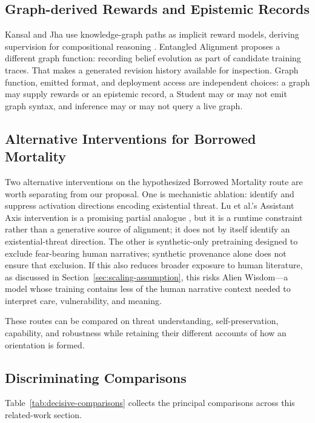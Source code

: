 \documentclass[11pt]{article}
\begin{document}
\subsection{Graph-derived Rewards and Epistemic Records}

Kansal and Jha use knowledge-graph paths as implicit reward models,
deriving supervision for compositional reasoning
\cite{kansal2026knowledgegraphsimplicitreward}. Entangled Alignment proposes a different graph
function: recording belief evolution as part of candidate training traces.
That makes a generated revision history available for inspection. Graph function, emitted format, and deployment access
are independent choices: a graph may supply rewards or an epistemic record,
a Student may or may not emit graph syntax, and inference may or may not
query a live graph.

\subsection{Alternative Interventions for Borrowed Mortality}

	Two alternative interventions on the hypothesized Borrowed Mortality route
are worth separating from our proposal.
	One is mechanistic ablation: identify and suppress activation directions
	encoding existential threat. Lu et al.'s Assistant Axis intervention is a
	promising partial analogue \cite{lu2026assistantaxissituatingstabilizing},
	but it is a runtime constraint rather than a generative source of alignment;
it does not by itself identify an existential-threat direction.
		The other is synthetic-only pretraining designed to exclude fear-bearing
		human narratives; synthetic provenance alone does not ensure that exclusion.
		If this also reduces broader exposure to human literature, as discussed in
		Section~\ref{sec:scaling-assumption}, this risks Alien Wisdom---a model whose
		training contains less of the human narrative context needed to interpret
		care, vulnerability, and meaning.

These routes can be compared on threat understanding, self-preservation,
capability, and robustness while retaining their different accounts of how an
orientation is formed.

\subsection{Discriminating Comparisons}
Table~\ref{tab:decisive-comparisons} collects the principal comparisons across
this related-work section.
\end{document}
